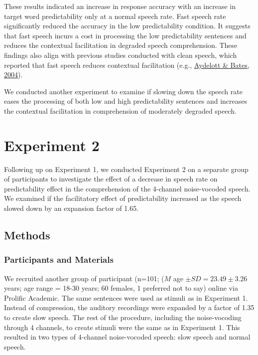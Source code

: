 \documentclass[a4paper, nobind]{templates/ociamthesis}
\begin{document}
These results indicated an increase in response accuracy with an increase in target word predictability only at a normal speech rate.
Fast speech rate significantly reduced the accuracy in the low predictability condition.
It suggests that fast speech incurs a cost in processing the low predictability sentences and reduces the contextual facilitation in degraded speech comprehension.
These findings also align with previous studies conducted with clean speech, which reported that fast speech reduces contextual facilitation (e.g., \protect\hyperlink{ref-Aydelott2004}{Aydelott \& Bates, 2004}).

We conducted another experiment to examine if slowing down the speech rate eases the processing of both low and high predictability sentences and increases the contextual facilitation in comprehension of moderately degraded speech.

\hypertarget{experiment-2}{%
\section{Experiment 2}\label{experiment-2}}

Following up on Experiment 1, we conducted Experiment 2 on a separate group of participants to investigate the effect of a decrease in speech rate on predictability effect in the comprehension of the 4-channel noise-vocoded speech.
We examined if the facilitatory effect of predictability increased as the speech slowed down by an expansion factor of 1.65.

\hypertarget{methods-4}{%
\subsection{Methods}\label{methods-4}}

\hypertarget{participants-and-materials-1}{%
\subsubsection{Participants and Materials}\label{participants-and-materials-1}}

We recruited another group of participant (n=101; (\(M\) age \(\pm SD=23.49\pm 3.26\) years; age range = 18-30 years; 60 females, 1 preferred not to say) online via Prolific Academic.
The same sentences were used as stimuli as in Experiment 1.
Instead of compression, the auditory recordings were expanded by a factor of 1.35 to create slow speech.
The rest of the procedure, including the noise-vocoding through 4 channels, to create stimuli were the same as in Experiment 1.
This resulted in two types of 4-channel noise-vocoded speech: slow speech and normal speech.
\end{document}
